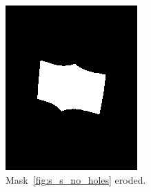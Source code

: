 \documentclass{article}
\begin{document}
\begin{figure}
\begin{subfigure}{0.3\textwidth}
    \includegraphics[width=\linewidth]{pictures/remove_knobs_erosion.png}
    \caption{Mask~\cref{fig:s_s_no_holes} eroded.}
    \label{fig:s_s_erosion}
  \end{subfigure}
  \hfill
  \begin{subfigure}{0.3\textwidth}
    \centering

\end{subfigure}
\end{figure}
\end{document}
